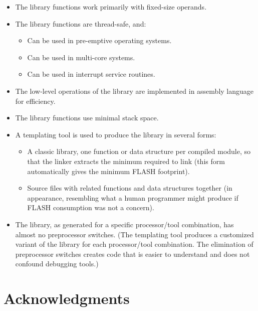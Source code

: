 \begin{itemize}
\item The library functions work primarily with fixed-size operands.
\item The library functions are thread-safe, and:
      \begin{itemize}
      \item Can be used in pre-emptive operating systems.
      \item Can be used in multi-core systems.
      \item Can be used in interrupt service routines.
      \end{itemize}
\item The low-level operations of the library are implemented in assembly language
      for efficiency.
\item The library functions use minimal stack space.
\item A templating tool is used to produce the library in several forms:
      \begin{itemize}
      \item A classic library, one function or data structure per compiled module,
            so that the linker extracts the minimum required to link (this form automatically
            gives the minimum FLASH footprint).
      \item Source files with related functions and data structures together (in appearance,
            resembling what a human programmer might produce if FLASH consumption was not
            a concern).
      \end{itemize}
\item The library, as generated for a specific processor/tool combination, has almost no
      preprocessor switches.  (The templating tool produces a customized variant
      of the library for each processor/tool combination.  The elimination of preprocessor
      switches creates code that is easier to understand and does not confound debugging tools.)
\end{itemize}


\section{Acknowledgments}
\label{ciov0:sack0}
 

